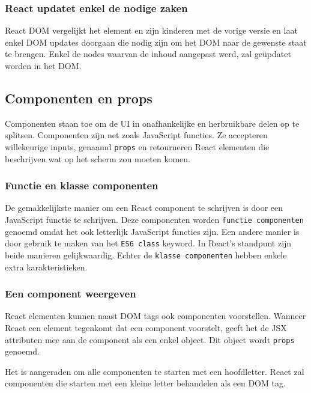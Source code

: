 \subsubsection{React updatet enkel de nodige zaken}

React DOM vergelijkt het element en zijn kinderen met de vorige versie en laat enkel DOM updates doorgaan die nodig zijn om het DOM naar de gewenste staat te brengen. Enkel de nodes waarvan de inhoud aangepast werd, zal geüpdatet worden in het DOM. \autocite{React2019b}

\subsection{Componenten en props}

Componenten staan toe om de UI in onafhankelijke en herbruikbare delen op te splitsen. Componenten zijn net zoals JavaScript functies. Ze accepteren willekeurige inputs, genaamd \texttt{props} en retourneren React elementen die beschrijven wat op het scherm zou moeten komen. \autocite{React2019b}

\subsubsection{Functie en klasse componenten}

De gemakkelijkste manier om een React component te schrijven is door een JavaScript functie te schrijven. Deze componenten worden \texttt{functie componenten} genoemd omdat het ook letterlijk JavaScript functies zijn. Een andere manier is door gebruik te maken van het \texttt{ES6 class} keyword. In React's standpunt zijn beide manieren gelijkwaardig. Echter de \texttt{klasse componenten} hebben enkele extra karakteristieken. \autocite{React2019b}

\subsubsection{Een component weergeven}

React elementen kunnen naast DOM tags ook componenten voorstellen. %
Wanneer React een element tegenkomt dat een component voorstelt, geeft het de JSX attributen mee aan de component als een enkel object. Dit object wordt \texttt{props} genoemd. \autocite{React2019b} %

Het is aangeraden om alle componenten te starten met een hoofdletter. React zal componenten die starten met een kleine letter behandelen als een DOM tag.  \autocite{React2019b}

